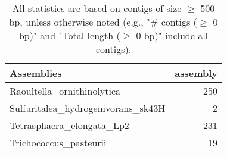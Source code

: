 \documentclass[12pt,a4paper]{article}
\begin{document}
\begin{table}[ht]
\begin{center}
\caption{All statistics are based on contigs of size $\geq$ 500 bp, unless otherwise noted (e.g., "\# contigs ($\geq$ 0 bp)" and "Total length ($\geq$ 0 bp)" include all contigs).}
\begin{tabular}{|l*{1}{|r}|}
\hline
Assemblies & assembly \\ \hline
Raoultella\_ornithinolytica & 250 \\ \hline
Sulfuritalea\_hydrogenivorans\_sk43H & 2 \\ \hline
Tetrasphaera\_elongata\_Lp2 & 231 \\ \hline
Trichococcus\_pasteurii & 19 \\ \hline
\end{tabular}
\end{center}
\end{table}
\end{document}
